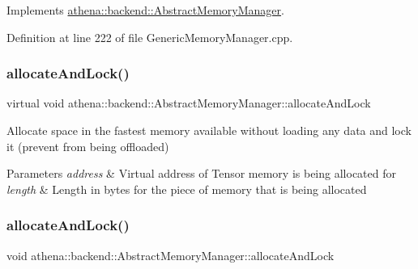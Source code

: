 Implements \mbox{\hyperlink{classathena_1_1backend_1_1_abstract_memory_manager_a1b80008e94c21d5ac87f9a45d3f212a8}{athena\+::backend\+::\+Abstract\+Memory\+Manager}}.



Definition at line 222 of file Generic\+Memory\+Manager.\+cpp.

\mbox{\label{classathena_1_1backend_1_1generic_1_1_generic_memory_manager_a1b80008e94c21d5ac87f9a45d3f212a8}} 
\subsubsection{\texorpdfstring{allocate\+And\+Lock()}{allocateAndLock()}\hspace{0.1cm}{\footnotesize\ttfamily [2/4]}}
{\footnotesize\ttfamily virtual void athena\+::backend\+::\+Abstract\+Memory\+Manager\+::allocate\+And\+Lock}

Allocate space in the fastest memory available without loading any data and lock it (prevent from being offloaded) 
\begin{DoxyParams}{Parameters}
{\em address} & Virtual address of Tensor memory is being allocated for \\
\hline
{\em length} & Length in bytes for the piece of memory that is being allocated \\
\hline
\end{DoxyParams}
\mbox{\label{classathena_1_1backend_1_1generic_1_1_generic_memory_manager_ad40a653a8b32410956ba835ca1bb3e5f}} 
\subsubsection{\texorpdfstring{allocate\+And\+Lock()}{allocateAndLock()}\hspace{0.1cm}{\footnotesize\ttfamily [3/4]}}
{\footnotesize\ttfamily void athena\+::backend\+::\+Abstract\+Memory\+Manager\+::allocate\+And\+Lock}

